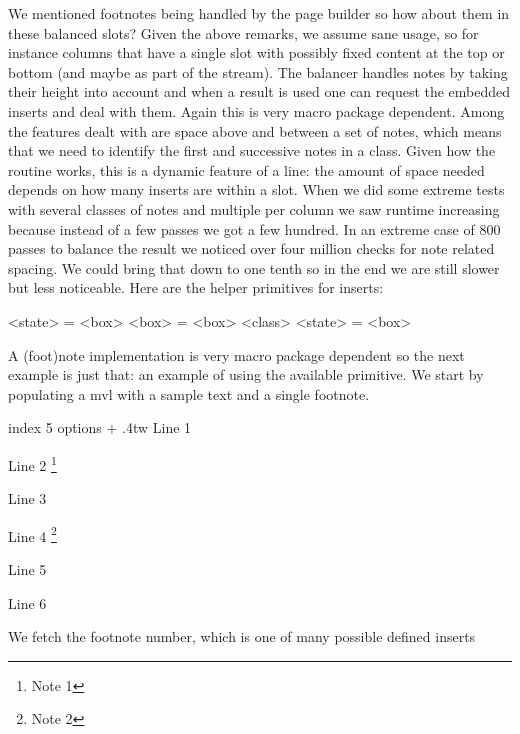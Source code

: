We mentioned footnotes being handled by the page builder so how about them in
these balanced slots? Given the above remarks, we assume sane usage, so for
instance columns that have a single slot with possibly fixed content at the top
or bottom (and maybe as part of the stream). The balancer handles notes by taking
their height into account and when a result is used one can request the embedded
inserts and deal with them. Again this is very macro package dependent. Among the
features dealt with are space above and between a set of notes, which means that
we need to identify the first and successive notes in a class. Given how the
routine works, this is a dynamic feature of a line: the amount of space needed
depends on how many inserts are within a slot. When we did some extreme tests
with several classes of notes and multiple per column we saw runtime increasing
because instead of a few passes we got a few hundred. In an extreme case of 800
passes to balance the result we noticed over four million checks for note related
spacing. We could bring that down to one tenth so in the end we are still slower
but less noticeable. Here are the helper primitives for inserts:

\starttyping
<state> = \boxinserts <box>
<box>   = \vbalancedinsert <box> <class>
<state> = \boxinserts <box>
\stoptyping

A (foot)note implementation is very macro package dependent so the next example
is just that: an example of using the available primitive. We start by populating
a mvl with a sample text and a single footnote.

\startbuffer[populate]
\begingroup
    \forgetall
    \beginmvl
        index 5
        options \numexpr
            \ignoreprevdepthmvloptioncode
          + \discardtopmvloptioncode
        \relax
    \relax
        \hsize .4tw
        Line 1 \par Line 2 \footnote {Note 1} \par Line 3 \par
        Line 4 \footnote {Note 2} \par Line 5 \par Line 6 \par
    \endmvl
\endgroup
\stopbuffer

\typebuffer[populate]

We fetch the footnote number, which is one of many possible defined
inserts

\startbuffer[whatever]
\cdef{}%
\scratchcounter\currentnoteinsertionnumber
\stopbuffer

